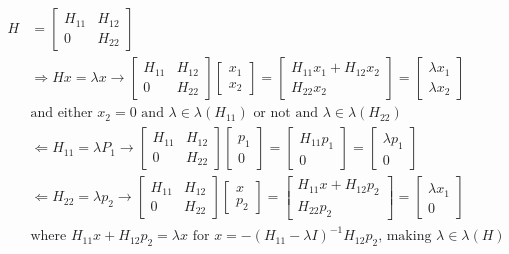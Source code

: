 \documentclass{article}
\begin{document}
\begin{align*}
    H &= \begin{bmatrix} H_{11} & H_{12} \\ 0 & H_{22} \end{bmatrix}\\
    &\Rightarrow Hx = \lambda x \longrightarrow \begin{bmatrix} H_{11} & H_{12} \\ 0 & H_{22} \end{bmatrix} \begin{bmatrix} x_1 \\ x_2 \end{bmatrix}
     = \begin{bmatrix} H_{11}x_1 + H_{12}x_2 \\ H_{22}x_2 \end{bmatrix} = \begin{bmatrix} \lambda x_1 \\ \lambda x_2 \end{bmatrix}\\
     & \textrm{and either $x_2=0$ and $\lambda \in \lambda(H_{11})$ or not and $\lambda \in \lambda(H_{22})$}\\
     &\Leftarrow H_{11} = \lambda P_1 \longrightarrow \begin{bmatrix} H_{11} & H_{12} \\ 0 & H_{22} \end{bmatrix} \begin{bmatrix} p_1 \\ 0 \end{bmatrix}
     = \begin{bmatrix} H_{11}p_1 \\ 0 \end{bmatrix} = \begin{bmatrix} \lambda p_1 \\ 0 \end{bmatrix}\\
     &\Leftarrow H_{22} = \lambda p_2 \longrightarrow \begin{bmatrix} H_{11} & H_{12} \\ 0 & H_{22} \end{bmatrix} \begin{bmatrix} x \\ p_2 \end{bmatrix}
     = \begin{bmatrix} H_{11}x + H_{12}p_2 \\ H_{22}p_2 \end{bmatrix} = \begin{bmatrix} \lambda x_1 \\ 0 \end{bmatrix}\\
     &\textrm{where } H_{11}x + H_{12}p_2 = \lambda x \textrm{ for } x = -(H_{11} - \lambda I)^{-1}H_{12}p_2 \textrm{, making } \lambda \in \lambda(H)
\end{align*}
\end{document}
